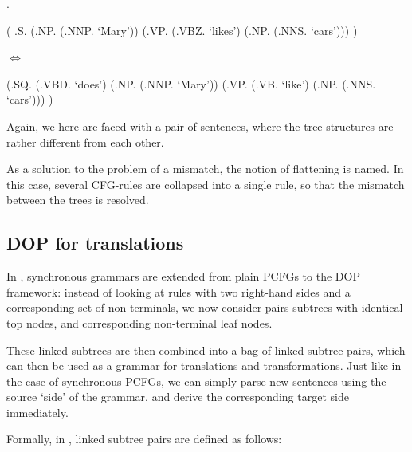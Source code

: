 \documentclass[a4paper]{article}
\theoremstyle{definition}
\begin{document}
\ex. \label{marylike}

\begin{center}
\begin{parsetree}
( .S.
    (.NP. (.NNP. `Mary'))
    (.VP. (.VBZ. `likes')
      (.NP. (.NNS. `cars')))
)
\end{parsetree}
$\iff$
\begin{parsetree}
  (.SQ. (.VBD. `does')
    (.NP. (.NNP. `Mary'))
    (.VP. (.VB. `like')
      (.NP. (.NNS. `cars')))
    )
\end{parsetree}
\end{center}
\vspace{1em}

Again, we here are faced with a pair of sentences, where the tree structures
are rather different from each other.

As a solution to the problem of a mismatch, the notion of flattening is named.
In this case, several CFG-rules are collapsed into a single rule, so that the
mismatch between the trees is resolved.

\subsection{DOP for translations}

In \citet{poutsma2000msc, poutsma2000coling}, synchronous grammars are extended
from plain PCFGs to the DOP framework: instead of looking at rules with two
right-hand sides and a corresponding set of non-terminals, we now consider
pairs subtrees with identical top nodes, and corresponding non-terminal leaf
nodes.

These linked subtrees are then combined into a bag of linked subtree pairs,
which can then be used as a grammar for translations and transformations. Just
like in the case of synchronous PCFGs, we can simply parse new sentences using
the source `side' of the grammar, and derive the corresponding target side
immediately.

Formally, in \citet{poutsma2000coling}, linked subtree pairs are defined as follows:
\end{document}
